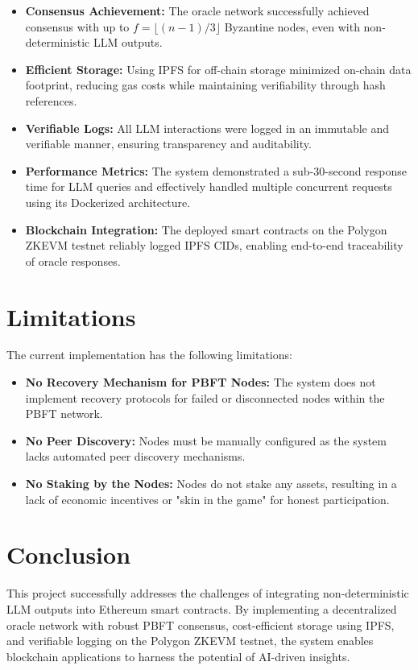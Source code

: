 \documentclass[12pt]{article}
\begin{document}
\begin{itemize}
    \item \textbf{Consensus Achievement:} The oracle network successfully achieved consensus with up to $f = \lfloor(n-1)/3\rfloor$ Byzantine nodes, even with non-deterministic LLM outputs.
    \item \textbf{Efficient Storage:} Using IPFS for off-chain storage minimized on-chain data footprint, reducing gas costs while maintaining verifiability through hash references.
    \item \textbf{Verifiable Logs:} All LLM interactions were logged in an immutable and verifiable manner, ensuring transparency and auditability.
    \item \textbf{Performance Metrics:} The system demonstrated a sub-30-second response time for LLM queries and effectively handled multiple concurrent requests using its Dockerized architecture.
    \item \textbf{Blockchain Integration:} The deployed smart contracts on the Polygon ZKEVM testnet reliably logged IPFS CIDs, enabling end-to-end traceability of oracle responses.
\end{itemize}

\section{Limitations}
The current implementation has the following limitations:
\begin{itemize}
    \item \textbf{No Recovery Mechanism for PBFT Nodes:} The system does not implement recovery protocols for failed or disconnected nodes within the PBFT network.
    \item \textbf{No Peer Discovery:} Nodes must be manually configured as the system lacks automated peer discovery mechanisms.
    \item \textbf{No Staking by the Nodes:} Nodes do not stake any assets, resulting in a lack of economic incentives or "skin in the game" for honest participation.
\end{itemize}

\section{Conclusion}
This project successfully addresses the challenges of integrating non-deterministic LLM outputs into Ethereum smart contracts. By implementing a decentralized oracle network with robust PBFT consensus, cost-efficient storage using IPFS, and verifiable logging on the Polygon ZKEVM testnet, the system enables blockchain applications to harness the potential of AI-driven insights.
\end{document}
